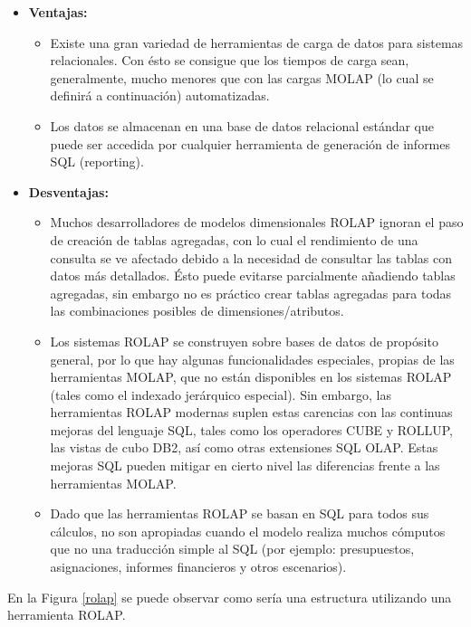 \documentclass[a4paper,11pt]{article}
\begin{document}
\begin{flushleft}
    \begin{itemize}
      \item \textbf{Ventajas:}
        \begin{itemize}
          \item Existe una gran variedad de herramientas de carga de datos para sistemas relacionales. Con ésto se consigue que los tiempos de carga
          sean, generalmente, mucho menores que con las cargas MOLAP (lo cual se definirá a continuación) automatizadas.
          \item Los datos se almacenan en una base de datos relacional estándar que puede ser accedida por cualquier herramienta de generación de
          informes SQL (reporting).
        \end{itemize}
      \item \textbf{Desventajas:}
        \begin{itemize}
          \item Muchos desarrolladores de modelos dimensionales ROLAP ignoran el paso de creación de tablas agregadas, con lo cual el rendimiento de
          una consulta se ve afectado debido a la necesidad de consultar las tablas con datos más detallados. Ésto puede evitarse parcialmente
          añadiendo tablas agregadas, sin embargo no es práctico crear tablas agregadas para todas las combinaciones posibles de dimensiones/atributos.
          \item Los sistemas ROLAP se construyen sobre bases de datos de propósito general, por lo que hay algunas funcionalidades especiales, propias
          de las herramientas MOLAP, que no están disponibles en los sistemas ROLAP (tales como el indexado jerárquico especial). Sin embargo, las
          herramientas ROLAP modernas suplen estas carencias con las continuas mejoras del lenguaje SQL, tales como los operadores CUBE y ROLLUP, las
          vistas de cubo DB2, así como otras extensiones SQL OLAP. Estas mejoras SQL pueden mitigar en cierto nivel las diferencias frente a las
          herramientas MOLAP.
          \item Dado que las herramientas ROLAP se basan en SQL para todos sus cálculos, no son apropiadas cuando el modelo realiza muchos cómputos que
          no una traducción simple al SQL (por ejemplo: presupuestos, asignaciones, informes financieros y otros escenarios).
        \end{itemize}
    \end{itemize}
    
    En la Figura \ref{rolap} se puede observar como sería una estructura utilizando una herramienta ROLAP.
    

\end{flushleft}
\end{document}
